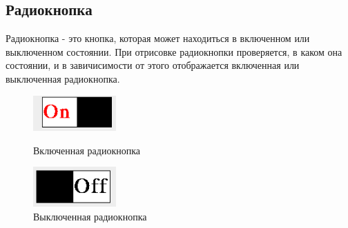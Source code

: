\documentclass[14pt]{extarticle}
\begin{document}
	\subsection{Радиокнопка}
		Радиокнопка - это кнопка, которая может находиться в включенном или выключенном состоянии. При отрисовке радиокнопки проверяется, в каком она состоянии, и в завичисимости от этого отображается включенная или выключенная радиокнопка.
		\begin{figure}[h]
		\begin{center}
		\begin{minipage}[h]{0.4\linewidth}
		\includegraphics[width=90pt]{pictures/toggleButton1.png}
		\caption{ Включенная радиокнопка} %
		\label{ris:b1} %
		\end{minipage}
		\hfill 
		\begin{minipage}[h]{0.4\linewidth}
		\includegraphics[width=90pt]{pictures/toggleButton2.png}
		\caption{Выключенная радиокнопка}
		\label{ris:b2}
		\end{minipage}
		\end{center}
		\end{figure}
		
\end{document}
